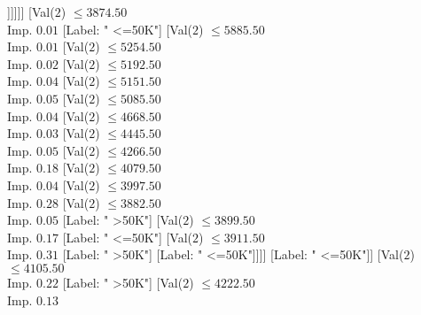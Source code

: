 \documentclass[margin=10pt]{standalone}
\begin{document}
\begin{forest}
																																							[Label: " >50K"]
																																							[Val($2$) $ \leq 3714.50$ \\ Imp. $0.13$
																																								[Label: " <=50K"]
																																								[Label: " >50K"]]]]]]
																																			[Val($2$) $ \leq 3874.50$ \\ Imp. $0.01$
																																				[Label: " <=50K"]
																																				[Val($2$) $ \leq 5885.50$ \\ Imp. $0.01$
																																					[Val($2$) $ \leq 5254.50$ \\ Imp. $0.02$
																																						[Val($2$) $ \leq 5192.50$ \\ Imp. $0.04$
																																							[Val($2$) $ \leq 5151.50$ \\ Imp. $0.05$
																																								[Val($2$) $ \leq 5085.50$ \\ Imp. $0.04$
																																									[Val($2$) $ \leq 4668.50$ \\ Imp. $0.03$
																																										[Val($2$) $ \leq 4445.50$ \\ Imp. $0.05$
																																											[Val($2$) $ \leq 4266.50$ \\ Imp. $0.18$
																																												[Val($2$) $ \leq 4079.50$ \\ Imp. $0.04$
																																													[Val($2$) $ \leq 3997.50$ \\ Imp. $0.28$
																																														[Val($2$) $ \leq 3882.50$ \\ Imp. $0.05$
																																															[Label: " >50K"]
																																															[Val($2$) $ \leq 3899.50$ \\ Imp. $0.17$
																																																[Label: " <=50K"]
																																																[Val($2$) $ \leq 3911.50$ \\ Imp. $0.31$
																																																	[Label: " >50K"]
																																																	[Label: " <=50K"]]]]
																																														[Label: " <=50K"]]
																																													[Val($2$) $ \leq 4105.50$ \\ Imp. $0.22$
																																														[Label: " >50K"]
																																														[Val($2$) $ \leq 4222.50$ \\ Imp. $0.13$

\end{forest}
\end{document}
